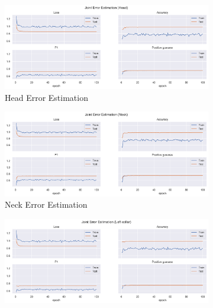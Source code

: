 \begin{figure}[!ht]
  \centering
  \begin{subfigure}[b]{0.47\linewidth}
      \centering
      \includegraphics[width=\textwidth]{figures/Results/v1_bs_60_is_64_e_100/jt/Head_ErrorEstimation.png}
      \caption{Head Error Estimation}
      \label{fig:v1_head_jt_ee}
  \end{subfigure}
  \hfill
  \begin{subfigure}[b]{0.47\linewidth}
      \centering
      \includegraphics[width=\textwidth]{figures/Results/v1_bs_60_is_64_e_100/jt/Neck_ErrorEstimation.png}
      \caption{Neck Error Estimation}
      \label{fig:v1_neck_jt_ee}
  \end{subfigure}
  \hfill
  \begin{subfigure}[b]{0.47\linewidth}
      \centering
      \includegraphics[width=\textwidth]{figures/Results/v1_bs_60_is_64_e_100/jt/Left collar_ErrorEstimation.png}

\end{subfigure}
\end{figure}
